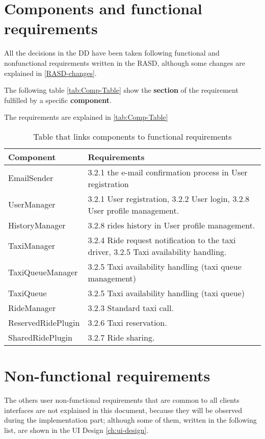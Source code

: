 \section{Components and functional requirements}
All the decisions in the DD have been taken following functional and nonfunctional requirements written in the RASD, although some changes are explained in \autoref{RASD-changes}.

The following table \autoref{tab:Comp-Table} show the {\bf section} of the requirement fulfilled by a specific {\bf component}. 

The requirements are explained in \autoref{tab:Comp-Table}
\begin{table}[h]
\begin{center}
\begin{tabular}{|p{}|p{}|}
\hline
{\bf Component}  & {\bf Requirements}\\
\hline
EmailSender & 3.2.1 the e-mail confirmation process in User registration \\
\hline
UserManager & 3.2.1 User registration, 3.2.2 User login, 3.2.8 User profile management.\\
\hline
HistoryManager & 3.2.8 rides history in User profile management.\\
\hline
TaxiManager & 3.2.4 Ride request notification to the taxi driver, 3.2.5 Taxi availability handling.\\
\hline
TaxiQueueManager & 3.2.5 Taxi availability handling (taxi queue management) \\
\hline
TaxiQueue & 3.2.5 Taxi availability handling (taxi queue)\\
\hline
RideManager & 3.2.3 Standard taxi call.\\
\hline 
ReservedRidePlugin & 3.2.6 Taxi reservation.\\
\hline
SharedRidePlugin & 3.2.7 Ride sharing.\\
\hline
\end{tabular}
\caption{Table that links components to functional requirements}
\label{tab:Comp-Table}
\end{center}
\end{table}

\section{Non-functional requirements}


The others user non-functional requirements that are common to all clients interfaces are not explained in this document, because they will be observed during the implementation part; although some of them, written in the following list, are shown in the UI Design \autoref{ch:ui-design}.

